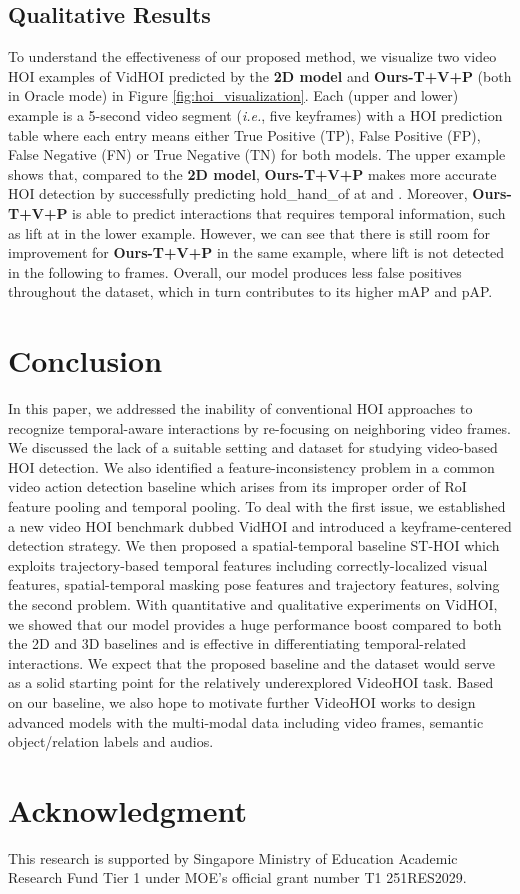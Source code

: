 \documentclass[sigconf]{acmart}
\begin{document}
\subsection{Qualitative Results}
\label{subsec:qualitative}

To understand the effectiveness of our proposed method, we visualize two video HOI examples of VidHOI predicted by the \textbf{2D model} \cite{wan2019pose} and \textbf{Ours-T+V+P} (both in {\selectfont Oracle} mode) in Figure \ref{fig:hoi_visualization}.
Each (upper and lower) example is a 5-second video segment (\emph{i.e.}, five keyframes) with a HOI prediction table where each entry means either True Positive (TP), False Positive (FP), False Negative (FN) or True Negative (TN) for both models.
The upper example shows that, compared to the \textbf{2D model}, \textbf{Ours-T+V+P} makes more accurate HOI detection by successfully predicting {\selectfont hold\_hand\_of} at  and .
Moreover, \textbf{Ours-T+V+P} is able to predict interactions that requires temporal information, such as {\selectfont lift} at  in the lower example.
However, we can see that there is still room for improvement for \textbf{Ours-T+V+P} in the same example, where {\selectfont lift} is not detected in the following  to  frames.
Overall, our model produces less false positives throughout the dataset, which in turn contributes to its higher mAP and pAP.

\section{Conclusion}
\label{sec:conclusion}

In this paper, we addressed the inability of conventional HOI approaches to recognize temporal-aware interactions by re-focusing on neighboring video frames.
We discussed the lack of a suitable setting and dataset for studying video-based HOI detection.
We also identified a feature-inconsistency problem in a common video action detection baseline which arises from its improper order of RoI feature pooling and temporal pooling.
To deal with the first issue, we established a new video HOI benchmark dubbed VidHOI and introduced a keyframe-centered detection strategy.
We then proposed a spatial-temporal baseline ST-HOI which exploits trajectory-based temporal features including correctly-localized visual features, spatial-temporal masking pose features and trajectory features, solving the second problem.
With quantitative and qualitative experiments on VidHOI, we showed that our model provides a huge performance boost compared to both the 2D and 3D baselines and is effective in differentiating temporal-related interactions.
We expect that the proposed baseline and the dataset would serve as a solid starting point for the relatively underexplored VideoHOI task.
Based on our baseline, we also hope to motivate further VideoHOI works to design advanced models with the multi-modal data including video frames, semantic object/relation labels and audios.

\section*{Acknowledgment}
This research is supported by Singapore Ministry of Education Academic Research Fund Tier 1 under MOE's official grant number T1 251RES2029.



\end{document}

